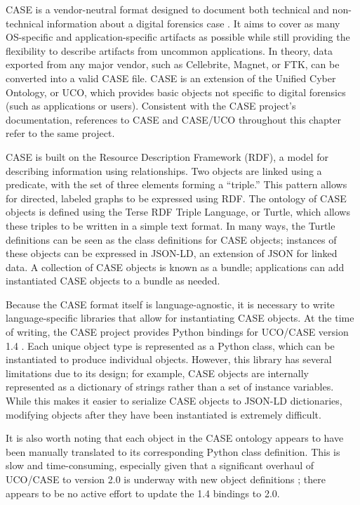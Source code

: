 CASE is a vendor-neutral format designed to document both technical and
non-technical information about a digital forensics case
\cite{caseyAdvancingCoordinatedCyberinvestigations2017}. It aims to
cover as many OS-specific and application-specific artifacts as possible
while still providing the flexibility to describe artifacts from
uncommon applications. In theory, data exported from any major vendor,
such as Cellebrite, Magnet, or FTK, can be converted into a valid CASE
file. CASE is an extension of the Unified Cyber Ontology, or UCO, which
provides basic objects not specific to digital forensics (such as
applications or users). Consistent with the CASE project's
documentation, references to CASE and CASE/UCO throughout this chapter
refer to the same project.

CASE is built on the Resource Description Framework (RDF), a model for
describing information using relationships. Two objects are linked using
a predicate, with the set of three elements forming a ``triple.'' This
pattern allows for directed, labeled graphs to be expressed using RDF.
The ontology of CASE objects is defined using the Terse RDF Triple
Language, or Turtle, which allows these triples to be written in a
simple text format. In many ways, the Turtle definitions can be seen as
the class definitions for CASE objects; instances of these objects can
be expressed in JSON-LD, an extension of JSON for linked data. A
collection of CASE objects is known as a bundle; applications can add
instantiated CASE objects to a bundle as needed.

Because the CASE format itself is language-agnostic, it is necessary to
write language-specific libraries that allow for instantiating CASE
objects. At the time of writing, the CASE project provides Python
bindings for UCO/CASE version 1.4 \cite{CaseworkCASEMappingPython}.
Each unique object type is represented as a Python class, which can be
instantiated to produce individual objects. However, this library has
several limitations due to its design; for example, CASE objects are
internally represented as a dictionary of strings rather than a set of
instance variables. While this makes it easier to serialize CASE objects
to JSON-LD dictionaries, modifying objects after they have been
instantiated is extremely difficult.

It is also worth noting that each object in the CASE ontology appears to
have been manually translated to its corresponding Python class
definition. This is slow and time-consuming, especially given that a
significant overhaul of UCO/CASE to version 2.0 is underway with new
object definitions \cite{UcoProjectUCODevelop2002025}; there appears
to be no active effort to update the 1.4 bindings to 2.0.

